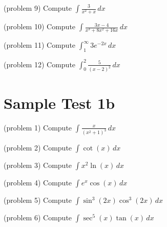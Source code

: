 \documentclass[handout]{ximera}
\begin{document}
\begin{problem}(problem 9)
Compute $\displaystyle \int \frac{3}{x^2 + x} \, dx$

\end{problem}

\begin{problem}(problem 10)
Compute $\displaystyle \int \frac{3x-4}{x^3 +8x^2 +16x} \, dx$

\end{problem}

\begin{problem}(problem 11)
Compute $\displaystyle \int_1^\infty 3e^{-2x} \, dx$

\end{problem}


\begin{problem}(problem 12)
Compute $\displaystyle \int_{0}^2 \frac{5}{(x-2)^2} \, dx$
\end{problem}




\section{Sample Test 1b}

\begin{problem}(problem 1)
Compute $\displaystyle \int \frac{x}{(x^2+1)^3} \, dx$

\end{problem}

\begin{problem}(problem 2)
Compute $\displaystyle \int \cot(x) \, dx$

\end{problem}



\begin{problem}(problem 3)
Compute $\displaystyle \int x^2\ln(x) \, dx$

\end{problem}


\begin{problem}(problem 4)
Compute $\displaystyle \int e^x \cos(x) \, dx$

\end{problem}

\begin{problem}(problem 5)
Compute $\displaystyle \int \sin^3(2x) \cos^3(2x) \, dx$

\end{problem}

\begin{problem}(problem 6)
Compute $\displaystyle \int \sec^5(x) \tan(x)  \, dx$

\end{problem}
\end{document}
